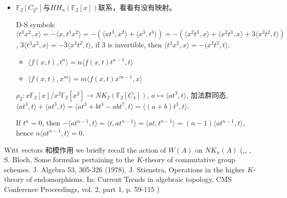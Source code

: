\begin{itemize}
	\item $\mathbb{F}_2[C_{2^n}]$与$HH_n(\mathbb{F}_2[x])$联系，看看有没有映射。
	\item[D-S symbols] $\langle t^3x^2,x \rangle = -\langle x, t^3x^2\rangle = - (\langle xt^3,x^2\rangle +\langle x^3,t^3 \rangle)=-(\langle x^2t^3,x \rangle + \langle x^2t^3,x\rangle + 3\langle x^3t^2,t \rangle)$, $3\langle t^3x^2,x \rangle = -3\langle x^3t^2,t \rangle$, if $3$ is invertible, then $\langle t^3x^2,x \rangle = -\langle x^3t^2,t \rangle$.
	\begin{itemize}
		\item $\langle f(x,t),t^n \rangle = n\langle f(x,t)t^{n-1},t \rangle$
		\item $\langle f(x,t),x^m \rangle = m\langle f(x,t)x^{m-1},x \rangle$
	\end{itemize}
	$\rho_2 \colon x\mathbb{F}_2[x]/x^2\mathbb{F}_2[x^2] \longrightarrow NK_2(\mathbb{F}_2[C_4])$, $a \mapsto \langle a t^3,t\rangle$, 加法群同态, $\langle a t^3,t\rangle +\langle a t^3,t\rangle =\langle a t^3+bt^3-abt^7,t\rangle=\langle (a+b) t^3,t\rangle$.

	If $t^n=0$, then $-\langle at^{n-1},t \rangle=\langle t,at^{n-1} \rangle=\langle at,t^{n-1} \rangle = (n-1)\langle at^{n-1},t \rangle$, hence $n\langle at^{n-1},t \rangle=0.$
\end{itemize}

Witt vectors 和模作用
we briefly recall the action of $W(A)$ on $NK_n(A)$ (\cite{MR82k:18010},\cite{MR55:5721}, \cite{MR81e:13014}, S. Bloch, Some formulas pertaining to the $K$-theory of commutative group schemes. J. Algebra 53, 305-326 (1978), J. Stienstra, Operations in the higher $K$-theory of endomorphisms. In: Current Trends in algebraic topology, CMS Conference Proceedings, vol. 2, part 1, p. 59-115 )






